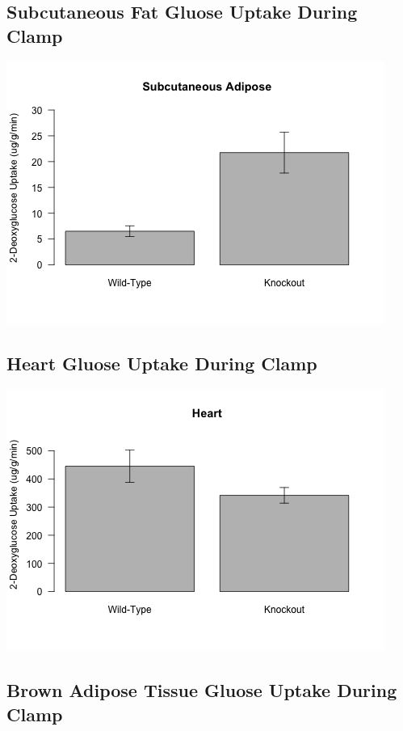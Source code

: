 \documentclass[]{article}
\begin{document}
\subsection{Subcutaneous Fat Gluose Uptake During
Clamp}\label{subcutaneous-fat-gluose-uptake-during-clamp}

\includegraphics{figures/s-fat-1.png}

\subsection{Heart Gluose Uptake During
Clamp}\label{heart-gluose-uptake-during-clamp}

\includegraphics{figures/heart-1.png}

\subsection{Brown Adipose Tissue Gluose Uptake During
Clamp}\label{brown-adipose-tissue-gluose-uptake-during-clamp}
\end{document}
